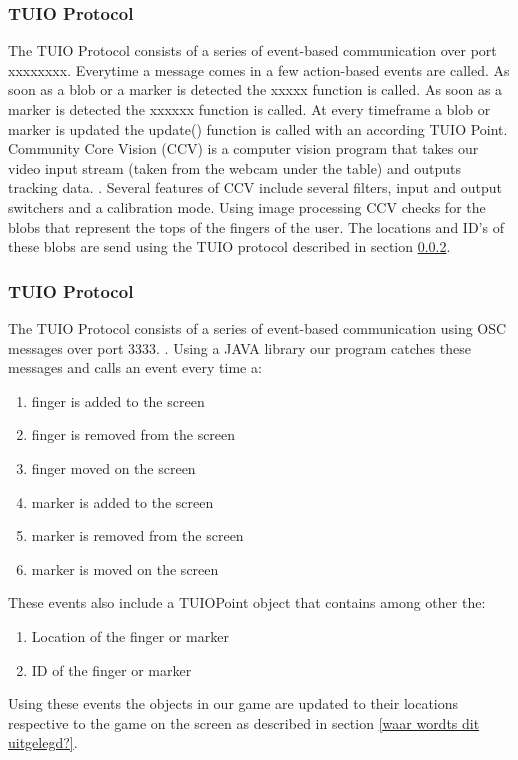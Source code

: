 \documentclass[a4paper,10pt]{article}
\begin{document}
		\subsubsection{TUIO Protocol}
		\label{sec:tuioprotocol}
		The TUIO Protocol consists of a series of event-based communication over port xxxxxxxx. 
		Everytime a message comes in a few action-based events are called.  
		As soon as a blob or a marker is detected the xxxxx function is called. 
		As soon as a marker is detected the xxxxxx function is called. 
		At every timeframe a blob or marker is updated the update() function is called with an according TUIO Point.
		Community Core Vision (CCV) is a computer vision program that takes our video input stream (taken from the webcam under the table) and outputs tracking data. \cite{ccv}.
		Several features of CCV include several filters, input and output switchers and a calibration mode. 
		Using image processing CCV checks for the blobs that represent the tops of the fingers of the user. 
		The locations and ID's of these blobs are send using the TUIO protocol described in section \ref{sec:tuioprotocol}.
		
		
		\subsubsection{TUIO Protocol}
		\label{sec:tuioprotocol}
		The TUIO Protocol consists of a series of event-based communication using OSC messages over port 3333. \cite{tuioProtocol}. 
		Using a JAVA library our program catches these messages and calls an event every time a:
		\begin{enumerate}
			\item finger is added to the screen
			\item finger is removed from the screen
			\item finger moved on the screen
			\item marker is added to the screen
			\item marker is removed from the screen
			\item marker is moved on the screen
		\end{enumerate}
		These events also include a TUIOPoint object that contains among other the:
		\begin{enumerate}
			\item Location of the finger or marker
			\item ID of the finger or marker
		\end{enumerate}
		Using these events the objects in our game are updated to their locations respective to the game on the screen as described in section \ref{waar wordts dit uitgelegd?}.
		
\end{document}
